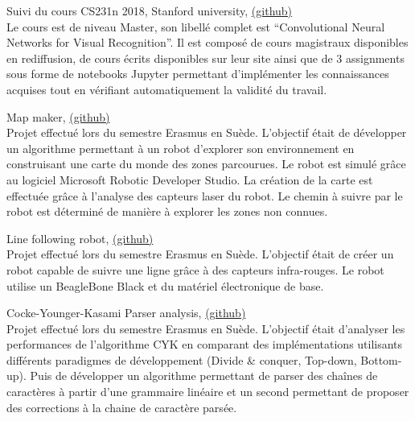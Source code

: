 {\large Suivi du cours CS231n 2018, Stanford university, \href{https://github.com/ThomasRanvier/stanford-cs231n}{(github)}}
\\
{\small Le cours est de niveau Master, son libell\'e complet est ``Convolutional Neural Networks for Visual Recognition''.
Il est compos\'e de cours magistraux disponibles en rediffusion, de cours \'ecrits disponibles sur leur site ainsi que de 3 assignments sous forme de notebooks Jupyter permettant d'impl\'ementer les connaissances acquises tout en v\'erifiant automatiquement la validit\'e du travail.}

\medskip
    
{\large Map maker, \href{https://github.com/ThomasRanvier/map_maker}{(github)}}
\\
{\small Projet effectu\'e lors du semestre Erasmus en Su\`ede. 
L'objectif \'etait de d\'evelopper un algorithme permettant \`a un robot d'explorer son environnement en construisant une carte du monde des zones parcourues.
Le robot est simul\'e gr\^ace au logiciel Microsoft Robotic Developer Studio.
La cr\'eation de la carte est effectu\'ee gr\^ace \`a l'analyse des capteurs laser du robot.
Le chemin \`a suivre par le robot est d\'etermin\'e de mani\`ere \`a explorer les zones non connues.}

\medskip
    
{\large Line following robot, \href{https://github.com/ThomasRanvier/line_following_robot}{(github)}}
\\
{\small Projet effectu\'e lors du semestre Erasmus en Su\`ede. 
L'objectif \'etait de cr\'eer un robot capable de suivre une ligne gr\^ace \`a des capteurs infra-rouges.
Le robot utilise un BeagleBone Black et du mat\'eriel \'electronique de base.}

\medskip

{\large Cocke-Younger-Kasami Parser analysis, \href{https://github.com/ThomasRanvier/cyk_algorithm_analysis}{(github)}}
\\
{\small Projet effectu\'e lors du semestre Erasmus en Su\`ede. 
L'objectif \'etait d'analyser les performances de l'algorithme CYK en comparant des impl\'ementations utilisants diff\'erents paradigmes de d\'eveloppement (Divide \& conquer, Top-down, Bottom-up).
Puis de d\'evelopper un algorithme permettant de parser des cha\^ines de caract\`eres \`a partir d'une grammaire lin\'eaire et un second permettant de proposer des corrections \`a la chaine de caract\`ere pars\'ee.}

\medskip

